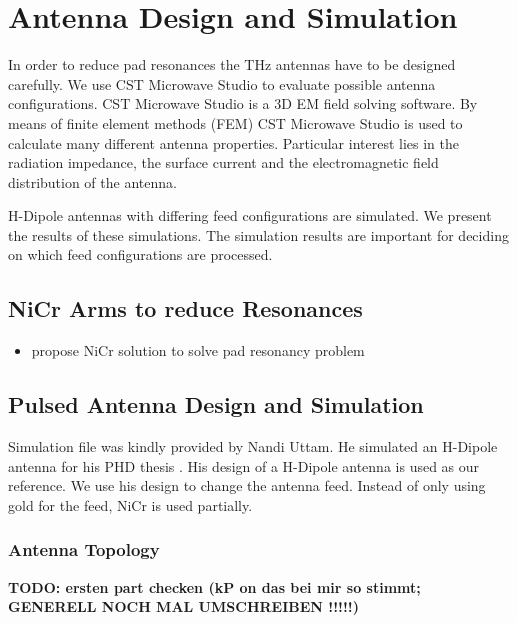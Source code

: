 \documentclass[
	german,%
	accentcolor=9c,%
	ruledheaders=section,%
	class=report,%
	thesis={type=bachelor},%
	fontsize=11pt,%
	parskip=half-,%
	custommargins=false,%
	marginpar=false,%
	BCOR=5mm,%
 	logofile=tools/logo-installation/TUDa-logos/tuda_logo.png,%
]{tudapub}
\begin{document}
\chapter{Antenna Design and Simulation}
In order to reduce pad resonances the THz antennas have to be designed carefully. We use CST Microwave Studio to evaluate possible antenna configurations. CST Microwave Studio is a 3D EM field solving software. By means of finite element methods (FEM) CST Microwave Studio is used to calculate many different antenna properties. Particular interest lies in the radiation impedance, the surface current and the electromagnetic field distribution of the antenna. 

H-Dipole antennas with differing feed configurations are simulated. We present the results of these simulations. The simulation results are important for deciding on which feed configurations are processed. 
\section{NiCr Arms to reduce Resonances}
\begin{itemize}
	\item propose NiCr solution to solve pad resonancy problem 
\end{itemize}
\section{Pulsed Antenna Design and Simulation}
Simulation file was kindly provided by Nandi Uttam. He simulated an H-Dipole antenna for his PHD thesis \cite{nandiErAsInAlGaAsPhotoconductors2021}. His design of a H-Dipole antenna is used as our reference. We use his design to change the antenna feed. Instead of only using gold for the feed, NiCr is used partially. 

\subsection{Antenna Topology}
\textbf{TODO: ersten part checken (kP on das bei mir so stimmt; GENERELL NOCH MAL UMSCHREIBEN !!!!!)}
\end{document}
